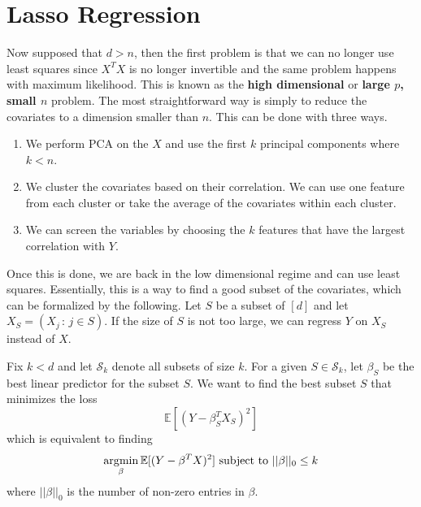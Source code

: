 \section{Lasso Regression} 

  Now supposed that $d > n$, then the first problem is that we can no longer use least squares since $X^T X$ is no longer invertible and the same problem happens with maximum likelihood. This is known as the \textbf{high dimensional} or \textbf{large $p$, small $n$} problem. The most straightforward way is simply to reduce the covariates to a dimension smaller than $n$. This can be done with three ways. 
  \begin{enumerate}
    \item We perform PCA on the $X$ and use the first $k$ principal components where $k < n$. 
    \item We cluster the covariates based on their correlation. We can use one feature from each cluster or take the average of the covariates within each cluster. 
    \item We can screen the variables by choosing the $k$ features that have the largest correlation with $Y$. 
  \end{enumerate}
  Once this is done, we are back in the low dimensional regime and can use least squares. Essentially, this is a way to find a good subset of the covariates, which can be formalized by the following. Let $S$ be a subset of $[d]$ and let $X_S = (X_j \,:\, j \in S)$. If the size of $S$ is not too large, we can regress $Y$ on $X_S$ instead of $X$. 

  \begin{definition}
    Fix $k < d$ and let $\mathcal{S}_k$ denote all subsets of size $k$. For a given $S \in \mathcal{S}_k$, let $\beta_S$ be the best linear predictor for the subset $S$. We want to find the best subset $S$ that minimizes the loss 
    \begin{equation}
      \mathbb{E} [ (Y - \beta_S^T X_S)^2] 
    \end{equation}
    which is equivalent to finding 
    \begin{equation}
      \operatorname*{\arg\!\min}_{\beta} \mathbb{E} [ (Y - \beta^T X)^2] \text{ subject to } ||\beta||_0 \leq k
    \end{equation}
    where $||\beta||_0$ is the number of non-zero entries in $\beta$. 
  \end{definition}

